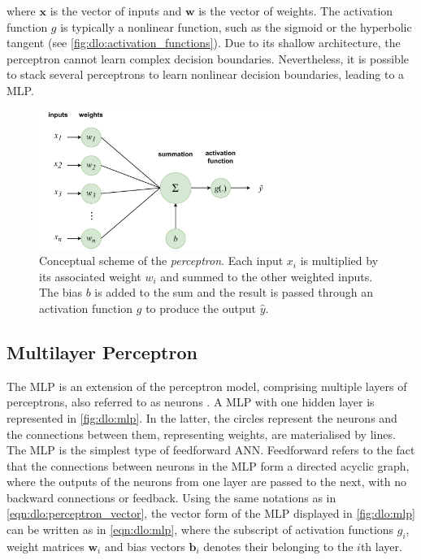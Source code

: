\noindent where $\mathbf{x}$ is the vector of inputs and $\mathbf{w}$ is the
vector of weights. The activation function $g$ is typically a nonlinear
function, such as the sigmoid or the hyperbolic tangent (see
\cref{fig:dlo:activation_functions}). Due to its shallow architecture, the
perceptron cannot learn complex decision boundaries. Nevertheless, it is
possible to stack several perceptrons to learn nonlinear decision boundaries,
leading to a \acl{MLP}.\\

\begin{figure}[htbp]
  \centering
  \includegraphics[width=0.7\textwidth]{chapter_dlo/assets/perceptron_scheme.pdf}
  \caption{Conceptual scheme of the \emph{perceptron}. Each input $x_i$ is multiplied
  by its associated weight $w_i$ and summed to the other weighted inputs. The
  bias $b$ is added to the sum and the result is passed through an activation
  function $g$ to produce the output $\hat{y}$.}
  \label{fig:dlo:perceptron}
\end{figure}

\subsection{Multilayer Perceptron}\label{sec:dlo:mlp}

The \acf{MLP} is an extension of the perceptron model, comprising multiple
layers of perceptrons, also referred to as neurons \cite{rumelhart1986learning}.
A \ac{MLP} with one hidden layer is represented in \cref{fig:dlo:mlp}. In the
latter, the circles represent the neurons and the connections between them,
representing weights, are materialised by lines. The \ac{MLP} is the simplest
type of feedforward \ac{ANN}. Feedforward refers to the fact that the
connections between neurons in the \ac{MLP} form a directed acyclic graph, where
the outputs of the neurons from one layer are passed to the next, with no
backward connections or feedback. Using the same notations as in
\cref{eqn:dlo:perceptron_vector}, the vector form of the \ac{MLP} displayed in
\cref{fig:dlo:mlp} can be written as in \cref{eqn:dlo:mlp}, where the subscript
of activation functions $g_i$, weight matrices $\mathbf{w}_i$ and bias vectors
$\mathbf{b}_i$ denotes their belonging to the $i$th layer.\\

